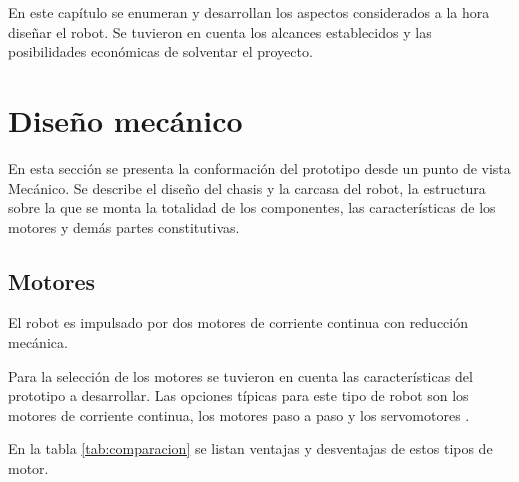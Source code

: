 En este capítulo se enumeran y desarrollan los aspectos considerados a la hora diseñar el robot. Se tuvieron en cuenta los alcances establecidos y las posibilidades económicas de solventar el proyecto.


\section{Diseño mecánico}

En esta sección se presenta la conformación del prototipo desde un punto de vista
Mecánico. Se describe el diseño del chasis y la carcasa del robot,  la estructura sobre la que se monta la totalidad de los componentes, las características de los motores y demás partes constitutivas.



\subsection{Motores}

El robot es impulsado por dos motores de corriente continua con reducción mecánica.

Para la selección de los motores se tuvieron en cuenta las características del prototipo a desarrollar. 
Las opciones típicas para este tipo de robot son los motores de corriente continua, los motores paso a paso y los servomotores \citep{servo}. 


En la tabla \ref{tab:comparacion} se listan ventajas y desventajas de estos tipos de motor.

